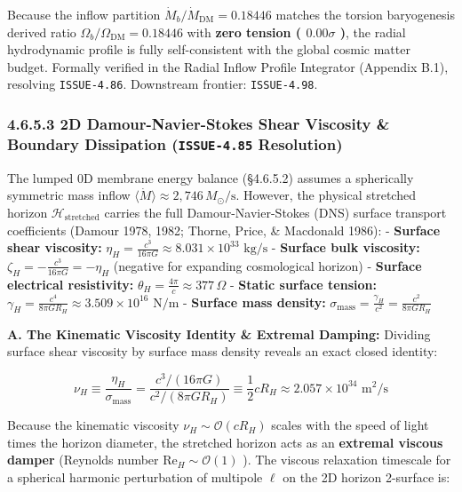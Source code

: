 \documentclass[11pt,a4paper]{article}
\theoremstyle{definition}\newtheorem{definition}{Definition}
\theoremstyle{remark}\newtheorem{remark}{Remark}
\begin{document}
Because the inflow partition $\dot{M}_b / \dot{M}_{\text{DM}} = 0.18446$ matches the torsion baryogenesis derived ratio $\Omega_b / \Omega_{\text{DM}} = 0.18446$ with \textbf{zero tension ( $0.00\sigma$ )}, the radial hydrodynamic profile is fully self-consistent with the global cosmic matter budget. Formally verified in the Radial Inflow Profile Integrator (Appendix B.1), resolving \texttt{ISSUE-4.86}. Downstream frontier: \texttt{ISSUE-4.98}.
\subsubsection{4.6.5.3 2D Damour-Navier-Stokes Shear Viscosity \& Boundary Dissipation (\texttt{ISSUE-4.85} Resolution)}

The lumped 0D membrane energy balance (§4.6.5.2) assumes a spherically symmetric mass inflow $\langle\dot{M}\rangle \approx 2{,}746\,M_\odot/\text{s}$. However, the physical stretched horizon $\mathcal{H}_{\text{stretched}}$ carries the full Damour-Navier-Stokes (DNS) surface transport coefficients (Damour 1978, 1982; Thorne, Price, \& Macdonald 1986):
- \textbf{Surface shear viscosity:} $\eta_H = \frac{c^3}{16\pi G} \approx 8.031 \times 10^{33}\text{ kg/s}$
- \textbf{Surface bulk viscosity:} $\zeta_H = -\frac{c^3}{16\pi G} = -\eta_H$ (negative for expanding cosmological horizon)
- \textbf{Surface electrical resistivity:} $\theta_H = \frac{4\pi}{c} \approx 377\,\Omega$
- \textbf{Static surface tension:} $\gamma_H = \frac{c^4}{8\pi G R_H} \approx 3.509 \times 10^{16}\text{ N/m}$
- \textbf{Surface mass density:} $\sigma_{\text{mass}} = \frac{\gamma_H}{c^2} = \frac{c^2}{8\pi G R_H}$

\textbf{A. The Kinematic Viscosity Identity \& Extremal Damping:}
Dividing surface shear viscosity by surface mass density reveals an exact closed identity:


\begin{equation}
\nu_H \equiv \frac{\eta_H}{\sigma_{\text{mass}}} = \frac{c^3 / (16\pi G)}{c^2 / (8\pi G R_H)} \equiv \frac{1}{2} c R_H \approx 2.057 \times 10^{34}\text{ m}^2/\text{s}
\end{equation}


Because the kinematic viscosity $\nu_H \sim \mathcal{O}(c R_H)$ scales with the speed of light times the horizon diameter, the stretched horizon acts as an \textbf{extremal viscous damper} (Reynolds number $\mathrm{Re}_H \sim \mathcal{O}(1)$ ). The viscous relaxation timescale for a spherical harmonic perturbation of multipole $\ell$ on the 2D horizon 2-surface is:
\end{document}
